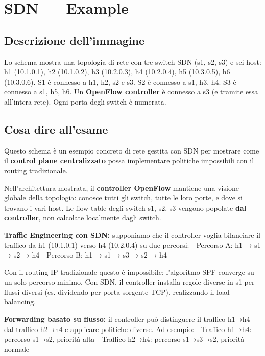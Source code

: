 \documentclass[
  italian,
  openany]{book}
\begin{document}
\section{SDN --- Example}\label{sdn-example}

\subsection{Descrizione dell'immagine}\label{descrizione-dellimmagine-7}

Lo schema mostra una topologia di rete con tre switch SDN (s1, s2, s3) e
sei host: h1 (10.1.0.1), h2 (10.1.0.2), h3 (10.2.0.3), h4 (10.2.0.4), h5
(10.3.0.5), h6 (10.3.0.6). S1 è connesso a h1, h2, s2 e s3. S2 è
connesso a s1, h3, h4. S3 è connesso a s1, h5, h6. Un \textbf{OpenFlow
controller} è connesso a s3 (e tramite essa all'intera rete). Ogni porta
degli switch è numerata.

\subsection{Cosa dire all'esame}\label{cosa-dire-allesame-7}

Questo schema è un esempio concreto di rete gestita con SDN per mostrare
come il \textbf{control plane centralizzato} possa implementare
politiche impossibili con il routing tradizionale.

Nell'architettura mostrata, il \textbf{controller OpenFlow} mantiene una
visione globale della topologia: conosce tutti gli switch, tutte le loro
porte, e dove si trovano i vari host. Le flow table degli switch s1, s2,
s3 vengono popolate \textbf{dal controller}, non calcolate localmente
dagli switch.

\textbf{Traffic Engineering con SDN:} supponiamo che il controller
voglia bilanciare il traffico da h1 (10.1.0.1) verso h4 (10.2.0.4) su
due percorsi: - Percorso A: h1 → s1 → s2 → h4 - Percorso B: h1 → s1 → s3
→ s2 → h4

Con il routing IP tradizionale questo è impossibile: l'algoritmo SPF
converge su un solo percorso minimo. Con SDN, il controller installa
regole diverse in s1 per flussi diversi (es. dividendo per porta
sorgente TCP), realizzando il load balancing.

\textbf{Forwarding basato su flusso:} il controller può distinguere il
traffico h1→h4 dal traffico h2→h4 e applicare politiche diverse. Ad
esempio: - Traffico h1→h4: percorso s1→s2, priorità alta - Traffico
h2→h4: percorso s1→s3→s2, priorità normale
\end{document}
